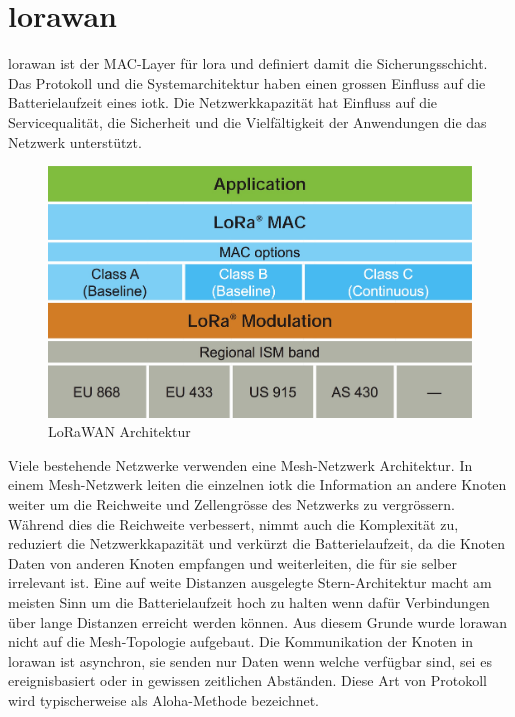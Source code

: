 \section{\gls{lorawan}}

\gls{lorawan} ist der MAC-Layer für \gls{lora} und definiert damit die Sicherungsschicht. Das Protokoll und die Systemarchitektur haben einen grossen Einfluss auf die Batterielaufzeit eines \gls{iotk}. Die Netzwerkkapazität hat Einfluss auf die Servicequalität, die Sicherheit und die Vielfältigkeit der Anwendungen die das Netzwerk unterstützt.

\begin{figure}[H]
     \centering
        \includegraphics[width=1.0\textwidth]{pictures/lorawan-architecture.jpg}
    \caption{LoRaWAN Architektur}
    \label{fig:LoRaWAN Architektur}
\end{figure}

Viele bestehende Netzwerke verwenden eine Mesh-Netzwerk Architektur. In einem Mesh-Netzwerk leiten die einzelnen \gls{iotk} die Information an andere Knoten weiter um die Reichweite und Zellengrösse des Netzwerks zu vergrössern. Während dies die Reichweite verbessert, nimmt auch die Komplexität zu, reduziert die Netzwerkkapazität und verkürzt die Batterielaufzeit, da die Knoten Daten von anderen Knoten empfangen und weiterleiten, die für sie selber irrelevant ist. Eine auf weite Distanzen ausgelegte Stern-Architektur macht am meisten Sinn um die Batterielaufzeit hoch zu halten wenn dafür Verbindungen über lange Distanzen erreicht werden können. Aus diesem Grunde wurde \gls{lorawan} nicht auf die Mesh-Topologie aufgebaut. Die Kommunikation der Knoten in \gls{lorawan} ist asynchron, sie senden nur Daten wenn welche verfügbar sind, sei es ereignisbasiert oder in gewissen zeitlichen Abständen. Diese Art von Protokoll wird typischerweise als Aloha-Methode bezeichnet.

